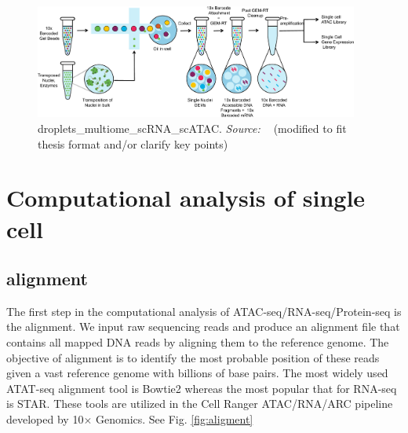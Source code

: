 \begin{figure}[!ht]
	\centering
	\includegraphics[width=0.95\textwidth]{droplets_multiome_scRNA_scATAC/fig}
	\vspace{0.1cm}
	\caption[droplets\_multiome\_scRNA\_scATAC.]{droplets\_multiome\_scRNA\_scATAC. \emph{Source: ~\cite{satpathy2019massively}} (modified to fit thesis format and/or clarify key points)}
	\label{fig:droplets_multiome_scRNA_scATAC}
\end{figure}


\section{Computational analysis of single cell}
\subsection{alignment}
The first step in the computational analysis of ATAC-seq/RNA-seq/Protein-seq is the alignment. We input raw sequencing reads and produce an alignment file that contains all mapped DNA reads by aligning them to the reference genome. The objective of alignment is to identify the most probable position of these reads given a vast reference genome with billions of base pairs. The most widely used ATAT-seq alignment tool is Bowtie2 whereas the most popular that for RNA-seq is STAR. These tools are utilized in the Cell Ranger ATAC/RNA/ARC pipeline developed by 10$\times$ Genomics. See Fig. \ref{fig:aligment}
